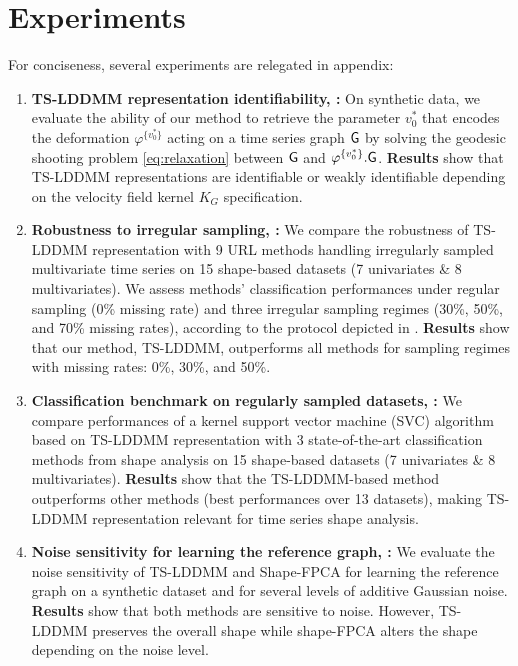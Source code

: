 \section{Experiments}
\vspace{-1ex}
\label{section:experiments}
For conciseness, several experiments are relegated in appendix: 

\begin{enumerate}
    \item \textbf{TS-LDDMM representation identifiability, :} On synthetic data, we evaluate the ability of our method to retrieve the parameter $v_0^*$ that encodes the deformation $\varphi^{\{v_0^*\}}$ acting on a time series graph $\mathsf{G}$ by solving the geodesic shooting problem \eqref{eq:relaxation} between $\mathsf{G}$ and $\varphi^{\{v_0^*\}}.\mathsf{G}$.
     \textbf{Results} show that TS-LDDMM representations are identifiable or weakly identifiable depending on the velocity field kernel $K_G$ specification.
  
    \item \textbf{Robustness to irregular sampling, :} We compare the robustness of TS-LDDMM representation with 9 URL methods handling irregularly sampled multivariate time series on 15 shape-based datasets (7 univariates \& 8 multivariates).
     We assess methods' classification performances under regular sampling (0\% missing rate) and three irregular sampling regimes (30\%, 50\%, and 70\% missing rates), according to the protocol depicted in \cite{kidger2020neural}.
      \textbf{Results} show that our method, TS-LDDMM, outperforms all methods for sampling regimes with missing rates: 0\%, 30\%, and 50\%.
    
    \item \textbf{Classification benchmark on regularly sampled datasets, :} We compare performances of a kernel support vector machine (SVC) algorithm based on TS-LDDMM representation with 3 state-of-the-art classification methods from shape analysis on 15 shape-based datasets (7 univariates \& 8 multivariates). \textbf{Results} show that the TS-LDDMM-based method outperforms other methods (best performances over 13 datasets), making TS-LDDMM representation relevant for time series shape analysis.
    
    \item \textbf{Noise sensitivity for learning the reference graph, :} We evaluate the noise sensitivity of TS-LDDMM and Shape-FPCA \cite{wu2024shape} for learning the reference graph on a synthetic dataset and for several levels of additive Gaussian noise. \textbf{Results} show that both methods are sensitive to noise. However, TS-LDDMM preserves the overall shape while shape-FPCA alters the shape depending on the noise level. 
\end{enumerate}

